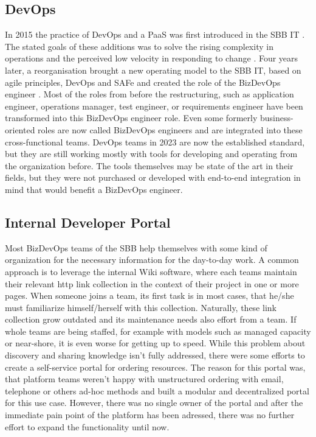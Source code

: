 \documentclass[a4paper,12pt]{article}
\begin{document}
    \subsection{DevOps}
    \label{subsec:sbbdevops}
    In 2015 the practice of DevOps and a PaaS was first introduced in the SBB IT .
    The stated goals of these additions was to solve the rising complexity in operations and the perceived low velocity
    in responding to change\parencite{sbbdevops} .
    Four years later, a reorganisation brought a new operating model to the SBB IT, based on agile principles, DevOps and SAFe
    and created the role of the BizDevOps engineer\parencite{sbbagile} .
    Most of the roles from before the restructuring, such as application engineer, operations manager, test engineer, or requirements engineer
    have been transformed into this BizDevOps engineer role.
    Even some formerly business-oriented roles are now called BizDevOps engineers and are integrated into these cross-functional
    teams.
    DevOps teams in 2023 are now the established standard, but they are still working mostly with tools for developing and
    operating from the organization before.
    The tools themselves may be state of the art in their fields, but they were not purchased or developed with
    end-to-end integration in mind that would benefit a BizDevOps engineer.

    \subsection{Internal Developer Portal}
    \label{subsec:sbbportal}
    Most BizDevOps teams of the SBB help themselves with some kind of organization for the necessary information
    for the day-to-day work.
    A common approach is to leverage the internal Wiki software, where each teams maintain their relevant http link
    collection in the context of their project in one or more pages.
    When someone joins a team, its first task is in most cases, that he/she must familiarize himself/herself with this
    collection.
    Naturally, these link collection grow outdated and its maintenance needs also effort from a team.
    If whole teams are being staffed, for example with models such as managed capacity or near-shore, it is even worse
    for getting up to speed.
    While this problem about discovery and sharing knowledge isn't fully addressed, there were some efforts to create
    a self-service portal for ordering resources.
    The reason for this portal was, that platform teams weren't happy with unstructured ordering with email, telephone or
    others ad-hoc methods and built a modular and decentralized portal for this use case.
    However, there was no single owner of the portal and after the immediate pain point of the platform has been adressed,
    there was no further effort to expand the functionality until now.
\end{document}
